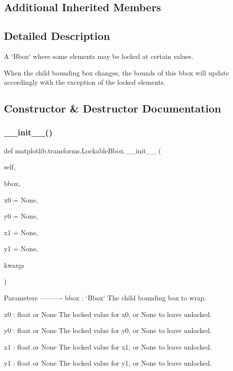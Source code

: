 \subsection*{Additional Inherited Members}


\subsection{Detailed Description}
\begin{DoxyVerb}A `Bbox` where some elements may be locked at certain values.

When the child bounding box changes, the bounds of this bbox will update
accordingly with the exception of the locked elements.
\end{DoxyVerb}
 

\subsection{Constructor \& Destructor Documentation}
\mbox{\label{classmatplotlib_1_1transforms_1_1LockableBbox_a7cdec0d9af34112fe56631b5cbc0698b}} 
\subsubsection{\texorpdfstring{\+\_\+\+\_\+init\+\_\+\+\_\+()}{\_\_init\_\_()}}
{\footnotesize\ttfamily def matplotlib.\+transforms.\+Lockable\+Bbox.\+\_\+\+\_\+init\+\_\+\+\_\+ (\begin{DoxyParamCaption}\item[{}]{self,  }\item[{}]{bbox,  }\item[{}]{x0 = {\ttfamily None},  }\item[{}]{y0 = {\ttfamily None},  }\item[{}]{x1 = {\ttfamily None},  }\item[{}]{y1 = {\ttfamily None},  }\item[{}]{kwargs }\end{DoxyParamCaption})}

\begin{DoxyVerb}Parameters
----------
bbox : `Bbox`
    The child bounding box to wrap.

x0 : float or None
    The locked value for x0, or None to leave unlocked.

y0 : float or None
    The locked value for y0, or None to leave unlocked.

x1 : float or None
    The locked value for x1, or None to leave unlocked.

y1 : float or None
    The locked value for y1, or None to leave unlocked.\end{DoxyVerb}
 

